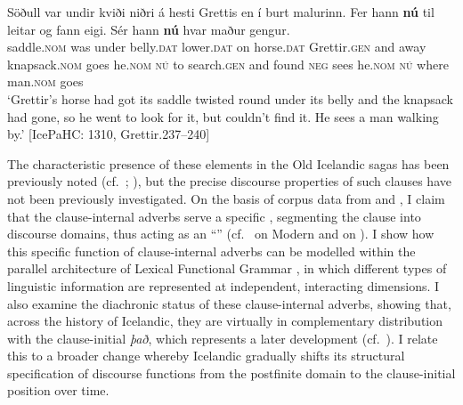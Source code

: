 \documentclass[output=paper,colorlinks,citecolor=brown]{langscibook}
\begin{document}
\ex
\gll  Söðull var undir kviði niðri á hesti Grettis en {í burt} malurinn. Fer hann \textbf{nú} til leitar og fann eigi. Sér hann \textbf{nú} hvar maður gengur.\\
saddle.\textsc{nom} was under belly.\textsc{dat} lower.\textsc{dat} on horse.\textsc{dat} Grettir.\textsc{gen} and away knapsack.\textsc{nom} goes he.\textsc{nom} \textsc{nú} to search.\textsc{gen} and found \textsc{neg} sees  he.\textsc{nom} \textsc{nú} where man.\textsc{nom} goes\\
\glt  `Grettir's horse had got its saddle twisted round under its belly and the knapsack had gone, so he went to look for it, but couldn't find it. He sees a man walking by.' \hfill [IcePaHC: 1310, Grettir.237--240]
\z 
\z 

\noindent The characteristic presence of these elements in the Old Icelandic sagas has been previously noted (cf.~\citealp[71]{clover1974scene}; \citealp[71]{Faarlund1990}), but the precise discourse properties of such clauses have not been previously investigated.  
On the basis of corpus data from  \citep{IcePaHC} and  \citep{MIcePaHC}, 
I claim that the clause-internal adverbs serve a specific , 
segmenting the clause into discourse domains, thus acting as an ``'' (cf.~\citealp{krivonosov1977deutsche,grosz2016information} on Modern  and \citealp{vanKem-Los2006} on ). I show how this specific function of clause-internal adverbs can be modelled within the parallel architecture of Lexical Functional Grammar \citep{bresnan-kaplan82,Bresnan2015lexical,dalrymple2019oxford}, in which different types of linguistic information are represented at independent, interacting dimensions. I also examine the diachronic status of these clause-internal adverbs, showing that, across the history of Icelandic, they are virtually in complementary distribution with the clause-initial  \textit{það}, which represents a later development (cf.~\citealp{Hroarsdottir1998,Rognvaldsson2002,booth2018,booth2019cataphora,booth2020expletives}). I relate this to a broader change whereby Icelandic gradually shifts its structural specification of discourse functions from the postfinite domain to the clause-initial position over time.
\end{document}
